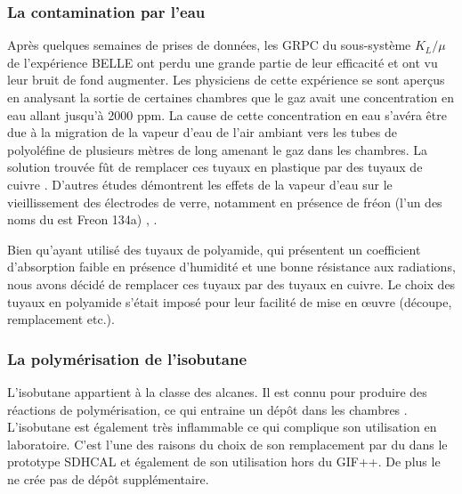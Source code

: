 \subsubsection{La contamination par l'eau}
Après quelques semaines de prises de données, les GRPC du sous-système $K_{L}/\mu$ de l'expérience BELLE ont perdu une grande partie de leur efficacité et ont vu leur bruit de fond augmenter. Les physiciens de cette expérience se sont aperçus en analysant la sortie de certaines chambres que le gaz avait une concentration en eau allant jusqu'à \num{2000} ppm. La cause de cette concentration en eau s'avéra être due à la migration de la vapeur d'eau de l'air ambiant vers les tubes de polyoléfine de plusieurs mètres de long amenant le gaz dans les chambres. La solution trouvée fût de remplacer ces tuyaux en plastique par des tuyaux de cuivre \cite{Abashian:2000vb}. D'autres études démontrent les effets de la vapeur d'eau sur le vieillissement des électrodes de verre, notamment en présence de fréon (l'un des noms du  est Freon 134a) \cite{Sakai:772080}, \cite{Kubo:2002jq}.

\newpage
Bien qu'ayant utilisé des tuyaux de polyamide, qui présentent un coefficient d'absorption faible en présence d'humidité et une bonne résistance aux radiations, nous avons décidé de remplacer ces tuyaux par des tuyaux en cuivre. Le choix des tuyaux en polyamide s'était imposé pour leur facilité de mise en œuvre (découpe, remplacement etc.). 

\subsubsection{La polymérisation de l'isobutane}
 L'isobutane  appartient à la classe des alcanes. Il est connu pour produire des réactions de polymérisation, ce qui entraine un dépôt dans les chambres \cite{na60}. L'isobutane est également très inflammable ce qui complique son utilisation en laboratoire. C'est l'une des raisons du choix de son remplacement par du  dans le prototype SDHCAL et également de son utilisation hors du GIF++. De plus le  ne crée pas de dépôt supplémentaire.

